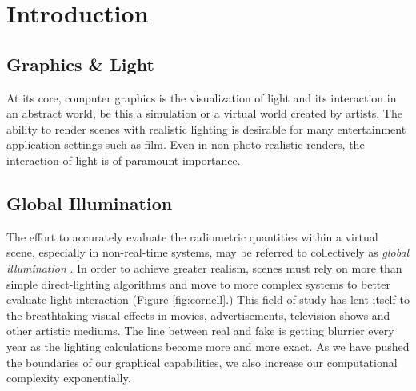 
\chapter{Introduction}
\label{intro}

\section{Graphics \& Light}
At its core, computer graphics is the visualization of light and its interaction in an abstract world, be this a simulation or a virtual world created by artists.  The ability to render scenes with realistic lighting is desirable for many entertainment application settings such as film.  Even in non-photo-realistic renders, the interaction of light is of paramount importance.

\section{Global Illumination}
The effort to accurately evaluate the radiometric quantities within a virtual scene, especially in non-real-time systems, may be referred to collectively as \textit{global illumination} \cite{verth:2008}.  In order to achieve greater realism, scenes must rely on more than simple direct-lighting algorithms and move to more complex systems to better evaluate light interaction (Figure \ref{fig:cornell}.)  This field of study has lent itself to the breathtaking visual effects in movies, advertisements, television shows and other artistic mediums.  The line between real and fake is getting blurrier every year as the lighting calculations become more and more exact.  As we have pushed the boundaries of our graphical capabilities, we also increase our computational complexity exponentially.

